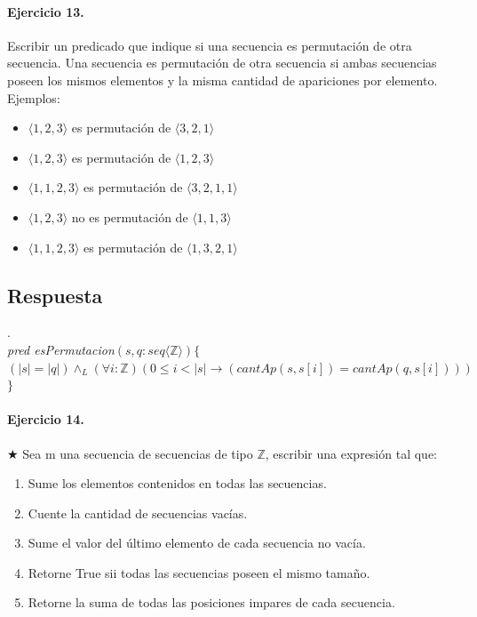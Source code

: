\documentclass[a4paper]{article}
\begin{document}
\paragraph{Ejercicio 13.} Escribir un predicado que indique si una secuencia es permutación de otra secuencia. Una secuencia es permutación de otra secuencia si ambas secuencias poseen los mismos elementos y la misma cantidad de apariciones por elemento. Ejemplos:
\begin{itemize}
\item $\langle 1,2,3\rangle$ es permutación de $\langle 3,2,1\rangle$
\item $\langle 1,2,3\rangle$ es permutación de $\langle 1,2,3\rangle$
\item $\langle 1,1,2,3\rangle$ es permutación de $\langle 3,2,1,1\rangle$
\item $\langle 1,2,3\rangle$ no es permutación de $\langle 1,1,3\rangle$
\item $\langle 1,1,2,3\rangle$ es permutación de $\langle 1,3,2,1\rangle$
\end{itemize}

\subsection*{Respuesta}.\\

\textit{pred esPermutacion}$(s,q:seq\langle \mathbb{Z}\rangle)\{$\\
\hspace*{9mm}$(|s|=|q|)\wedge_L (\forall i:\mathbb{Z})(0\leq i <|s|\rightarrow (cantAp(s,s[i])=cantAp(q,s[i]))) $\\
\hspace*{5mm}$\}$

\paragraph{Ejercicio 14.} $\bigstar$ Sea m una secuencia de secuencias de tipo $\mathbb{Z}$, escribir una expresión tal que:
\begin{enumerate}[label=\alph*)]
\item Sume los elementos contenidos en todas las secuencias.
\item Cuente la cantidad de secuencias vacías.
\item Sume el valor del último elemento de cada secuencia no vacía.
\item Retorne True sii todas las secuencias poseen el mismo tamaño.
\item Retorne la suma de todas las posiciones impares de cada secuencia.
\end{enumerate}
\end{document}
